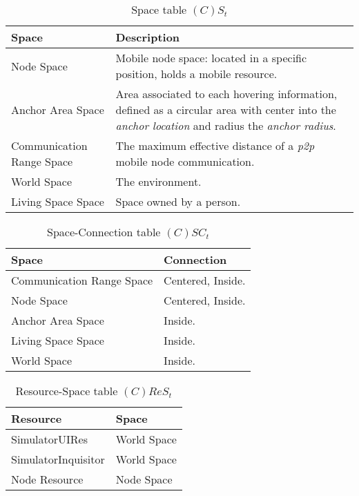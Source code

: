 \begin{table}[H]
	\centering
	\begin{tabular}{|p{4cm}|p{8cm}|}
			\hline
			\textbf{Space} & \textbf{Description} \\
			\hline
			Node Space & Mobile node space: located in a specific position, holds a
			mobile resource. \\
			\hline
			Anchor Area Space & Area associated to each hovering information, defined as a
			circular area with center into the \emph{anchor location} and radius the
			\emph{anchor radius}.\\
			\hline
			Communication Range Space & The maximum effective distance of a \emph{p2p}
			mobile node communication. \\
			\hline
			World Space & The environment. \\
			\hline
			Living Space Space & Space owned by a person. \\
			\hline
		\end{tabular}
	\caption{Space table $(C)S_t$}
	\label{tab:st}
\end{table}

\begin{table}[H]
	\centering
	\begin{tabular}{|p{4cm}|p{8cm}|}
			\hline
			\textbf{Space} & \textbf{Connection} \\
			\hline
			Communication Range Space & Centered, Inside. \\
			\hline
			Node Space & Centered, Inside. \\
			\hline
			Anchor Area Space & Inside. \\
			\hline
			Living Space Space & Inside. \\
			\hline
			World Space & Inside. \\
			\hline
		\end{tabular}
	\caption{Space-Connection table $(C)SC_t$}
	\label{tab:sct}
\end{table}

\begin{table}[H]
	\centering
	\begin{tabular}{|p{4cm}|p{8cm}|}
			\hline
			\textbf{Resource} & \textbf{Space} \\
			\hline
			SimulatorUIRes & World Space \\
			\hline
			SimulatorInquisitor & World Space \\
			\hline
			Node Resource & Node Space \\
			\hline
		\end{tabular}
	\caption{Resource-Space table $(C)ReS_t$}
	\label{tab:crest}
\end{table}

